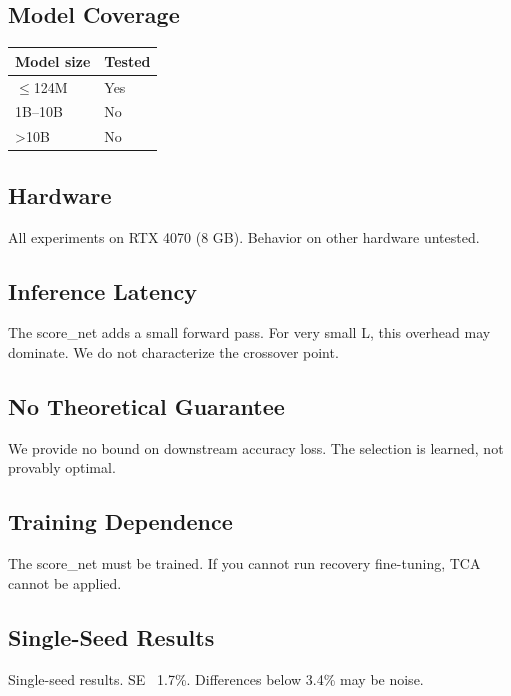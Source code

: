 \subsection{Model Coverage}

\begin{table}[H]
\centering
\small
\begin{tabular}{ll}
\toprule
\textbf{Model size} & \textbf{Tested} \\
\midrule
$\le$124M & Yes \\
1B--10B & No \\
\textgreater{}10B & No \\
\bottomrule
\end{tabular}
\end{table}

\subsection{Hardware}

All experiments on RTX 4070 (8 GB). Behavior on other hardware untested.

\subsection{Inference Latency}

The score\_net adds a small forward pass. For very small L, this overhead 
may dominate. We do not characterize the crossover point.

\subsection{No Theoretical Guarantee}

We provide no bound on downstream accuracy loss. The selection is learned, 
not provably optimal.

\subsection{Training Dependence}

The score\_net must be trained. If you cannot run recovery fine-tuning, TCA 
cannot be applied.

\subsection{Single-Seed Results}

Single-seed results. SE ~1.7\%. Differences below 3.4\% may be noise.

